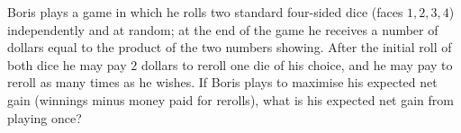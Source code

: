 Boris plays a game in which he rolls two standard four-sided dice (faces $1,2,3,4$) independently and at random; at the end of the game he receives a number of dollars equal to the product of the two numbers showing. After the initial roll of both dice he may pay $2$ dollars to reroll one die of his choice, and he may pay to reroll as many times as he wishes. If Boris plays to maximise his expected net gain (winnings minus money paid for rerolls), what is his expected net gain from playing once?
